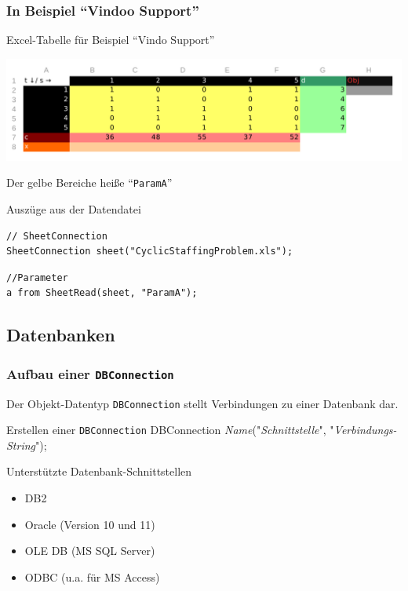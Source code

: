 \begin{frame}[fragile]
 \frametitle{In Beispiel "`Vindoo Support"'}
 \begin{block}{Excel-Tabelle für Beispiel "`Vindo Support"'}
  \begin{center}
   \includegraphics[width=.9\linewidth]{Bilder/CyclicStaffingData}
  \end{center}\vspace{-1\baselineskip}
  Der gelbe Bereiche heiße "`\texttt{ParamA}"'
 \end{block}
 \begin{block}{Auszüge aus der Datendatei}
\begin{lstlisting}[language=opldata,numbers=none,basicstyle=\ttfamily\scriptsize]
// SheetConnection
SheetConnection sheet("CyclicStaffingProblem.xls");
\end{lstlisting}\vspace{-2\baselineskip}
\begin{lstlisting}[language=opldata,numbers=none,basicstyle=\ttfamily\scriptsize]
//Parameter
a from SheetRead(sheet, "ParamA");
\end{lstlisting}
 \end{block}
\end{frame}

\subsection{Datenbanken}
\begin{frame}
 \frametitle{Aufbau einer \texttt{DBConnection}}
 Der Objekt-Datentyp \texttt{DBConnection} stellt Verbindungen zu einer Datenbank dar.
 \begin{block}{Erstellen einer \texttt{DBConnection}}
  \ttfamily
  DBConnection \textsf{\slshape Name}("\textsf{\slshape Schnittstelle}", "\textsf{\slshape Verbindungs-String}");
 \end{block}
 \begin{block}{Unterstützte Datenbank-Schnittstellen}
  \begin{itemize}
   \item DB2
   \item Oracle (Version 10 und 11)
   \item OLE DB (MS SQL Server)
   \item ODBC (u.a. für MS Access)
  \end{itemize}
 \end{block}
\end{frame}


